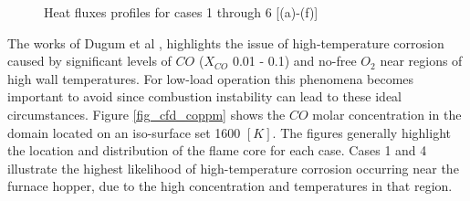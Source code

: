 \documentclass[review]{elsarticle}
\begin{document}
\begin{figure}[h!]
\hspace{5mm}
\caption{Heat fluxes profiles for cases 1 through 6 [(a)-(f)]}
\label{fig_cfd_heat_flux}
\end{figure}

The works of Dugum et al \citep{Du2017}, highlights the issue of high-temperature corrosion caused by significant levels of $CO$ ($X_{CO}$ 0.01 - 0.1) and no-free $O_2$ near regions of high wall temperatures. For low-load operation this phenomena becomes important to avoid since combustion instability can lead to these ideal circumstances. Figure \ref{fig_cfd_coppm} shows the $CO$ molar concentration in the domain located on an iso-surface set 1600 $[K]$. The figures generally highlight the location and distribution of the flame core for each case. Cases 1 and 4 illustrate the highest likelihood of high-temperature corrosion occurring near the furnace hopper, due to the high concentration and temperatures in that region.
\end{document}
